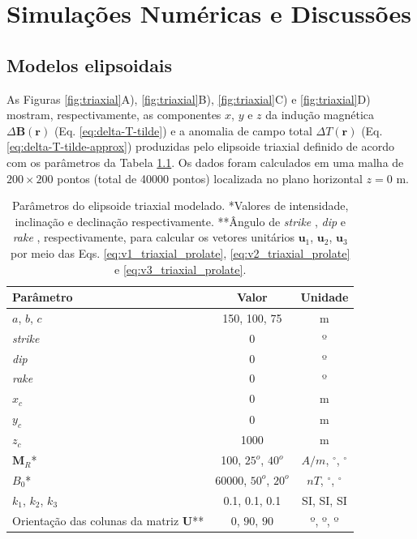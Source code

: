 \chapter{Simulações Numéricas e Discussões}

\section{Modelos elipsoidais}

As Figuras \ref{fig:triaxial}A), \ref{fig:triaxial}B), \ref{fig:triaxial}C) e \ref{fig:triaxial}D) mostram, respectivamente, as componentes $x$, $y$ e $z$ da indução magnética $\Delta \mathbf{B}(\mathbf{r})$ (Eq. \ref{eq:delta-T-tilde}) e a
anomalia de campo total $\Delta T (\mathbf{r})$ (Eq. \ref{eq:delta-T-tilde-approx}) produzidas pelo elipsoide triaxial definido de acordo com os parâmetros da Tabela \ref{tab:triaxial}.
Os dados foram calculados em uma malha de $200 \times 200$ pontos (total de 40000 pontos) localizada no plano horizontal $z = 0$ m.

\begin{table}[h]
	\begin{center}
		\begin{tabular}{|l|c|c|}
			\hline
			\textbf{Parâmetro}  & \textbf{Valor}  & \textbf{Unidade} \\
			\hline 
			$a$, $b$, $c$   & 150, 100, 75 & m\\
			\hline
			\textit{strike}   & $0$ & º\\
			\hline
			\textit{dip} & $0$ & º\\
			\hline
			\textit{rake} & $0$  & º\\
			\hline
			$x_{c}$   & 0  & m\\
			\hline          
			$y_{c}$   & 0  & m\\
			\hline                
			$z_{c}$   & 1000 & m\\
			\hline
			$\mathbf{M}_{R}$*  & 100, $25^o$, $40^o$  & $A/m$, $^{\circ}$, $^{\circ}$\\
			\hline
			$B_0$*    & 60000, $50^o$, $20^o$ & $nT$, $^{\circ}$, $^{\circ}$\\
			\hline
			$k_{1}$, $k_{2}$, $k_{3}$   & 0.1, 0.1, 0.1  & SI, SI, SI\\
			\hline
			Orientação das colunas da matriz $\mathbf{U}$**   & $0$, $90$, $90$  & º, º, º\\
			\hline
		\end{tabular}
		\caption{Parâmetros do elipsoide triaxial modelado. *Valores de intensidade, inclinação e declinação respectivamente. **Ângulo de \textit{strike} , \textit{dip}  e \textit{rake} , respectivamente, para calcular os vetores unitários $\mathbf{u}_{1}$, $\mathbf{u}_{2}$, $\mathbf{u}_{3}$ por meio das Eqs. \ref{eq:v1_triaxial_prolate}, \ref{eq:v2_triaxial_prolate} e \ref{eq:v3_triaxial_prolate}.}
	\end{center}
	\label{tab:triaxial}
\end{table}

